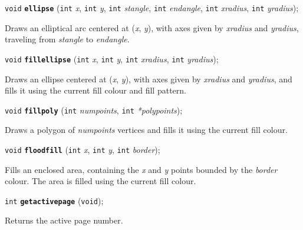 \documentclass[a4paper,12pt]{article}
\newcommand{\V}{\texttt{void}}      %
\newcommand{\I}{\texttt{int}}       %
\newcommand{\func}[1]{\textbf{\texttt{#1}}}  %
\newcommand{\A}[1]{\emph{#1}}       %
\newenvironment{bgi}
{ %
  \begin{snugshade}
}
{ %
  \end{snugshade}
}
\begin{document}
\begin{bgi}
\V{} \func{ellipse} (\I{} \A{x}, \I{} \A{y}, \I{} \A{stangle}, \I{}
\A{endangle}, \I{} \A{xradius}, \I{} \A{yradius});
\end{bgi}

Draws an elliptical arc centered at (\A{x}, \A{y}), with axes given by
\A{xradius} and \A{yradius}, traveling from \A{stangle} to
\A{endangle}.


\label{sec:fillellipse}

\begin{bgi}
\V{} \func{fillellipse} (\I{} \A{x}, \I{} \A{y}, \I{} \A{xradius},
\I{} \A{yradius});
\end{bgi}

Draws an ellipse centered at (\A{x}, \A{y}), with axes given by
\A{xradius} and \A{yradius}, and fills it using the current fill
colour and fill pattern.


\label{sec:fillpoly}

\begin{bgi}
\V{} \func{fillpoly} (\I{} \A{numpoints}, \I{} \A{*polypoints});
\end{bgi}

Draws a polygon of \A{numpoints} vertices and fills it using the
current fill colour.


\label{sec:floodfill}

\begin{bgi}
\V{} \func{floodfill} (\I{} \A{x}, \I{} \A{y}, \I{} \A{border});
\end{bgi}

Fills an enclosed area, containing the \A{x} and \A{y} points bounded
by the \A{border} colour. The area is filled using the current fill
colour.


\label{sec:getactivepage}

\begin{bgi}
\I{} \func{getactivepage} (\V{});
\end{bgi}

Returns the active page number.

\end{document}
